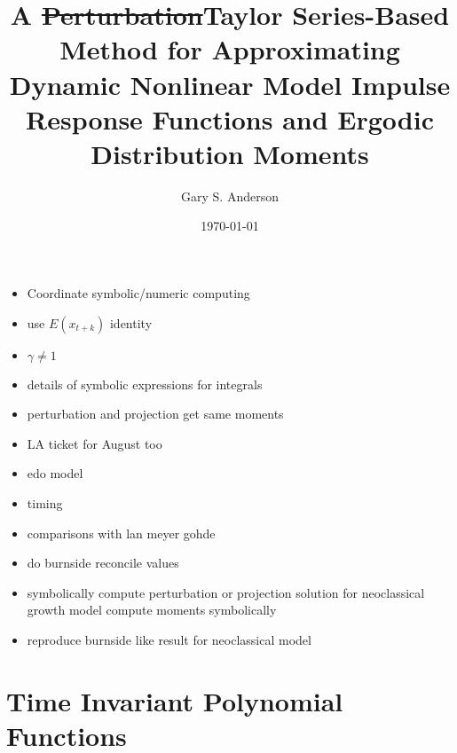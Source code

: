 \documentclass{beamer}
\theoremstyle{definition}
\begin{document}
\title[Taylor Series-Based Ergodic Distribution Moments]{A \st{Perturbation}Taylor Series-{Based} Method for Approximating Dynamic Nonlinear Model Impulse Response Functions and Ergodic Distribution Moments }
\author{Gary S. Anderson}
\date{\today} 

\frame{\titlepage} 

%
%
%	
%
%
\begin{itemize}
\item Coordinate symbolic/numeric computing
\item use $E(x_{t+k})$ identity
\item $\gamma \ne 1$
\item details of symbolic expressions for integrals
\item perturbation and projection get same moments
\item LA ticket for August too
\item edo model
\item timing
\item comparisons with lan meyer gohde
\item do burnside reconcile values
\item symbolically compute perturbation or projection solution for neoclassical growth model  compute moments symbolically
\item reproduce burnside like result for neoclassical model
\end{itemize}


\section{Time Invariant Polynomial Functions} 


\end{document}
